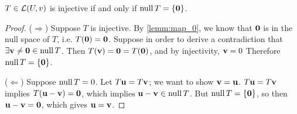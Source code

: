 \documentclass{article}
\begin{document}
\begin{theorem}
$T \in {\mathcal{L}}(U,v)$ is injective if and only if $\operatorname{null} T = \{ {\mathbf{0}} \}$.
\end{theorem}
\begin{proof}
($\Rightarrow$) Suppose $T$ is injective. By \cref{lemm:map_0}, we know that ${\mathbf{0}}$ is in the null space of $T$, i.e. $T({\mathbf{0}}) = {\mathbf{0}}$. Suppose in order to derive a contradiction that $\exists {\mathbf{v}} \neq {\mathbf{0}} \in \operatorname{null} T$. Then $T({\mathbf{v}}) = {\mathbf{0}} = T({\mathbf{0}})$, and by injectivity, ${\mathbf{v}} = 0$ Therefore $\operatorname{null} T = \{{\mathbf{0}}\}$. 

($\Leftarrow$) Suppose $\operatorname{null} T = 0$. Let $T{\mathbf{u}} = T{\mathbf{v}}$; we want to show ${\mathbf{v}} = {\mathbf{u}}$. $T{\mathbf{u}} = T{\mathbf{v}}$ implies $T ({\mathbf{u}} - {\mathbf{v}}) = {\mathbf{0}}$, which implies ${\mathbf{u}} - {\mathbf{v}} \in \operatorname{null} T$. But $\operatorname{null} T = \{{\mathbf{0}}\}$, so then ${\mathbf{u}} - {\mathbf{v}} = {\mathbf{0}}$, which gives ${\mathbf{u}}={\mathbf{v}}$.
\end{proof}

\end{document}
